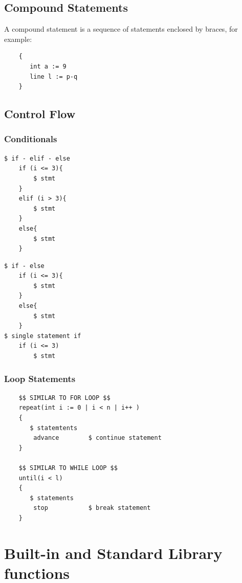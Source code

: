 \documentclass[12pt]{article}
\begin{document}
\subsection{Compound Statements}
A compound statement is a sequence of statements enclosed by braces, for example:
\begin{verbatim}
    {
       int a := 9
       line l := p-q
    }
\end{verbatim}

\subsection{Control Flow}

\subsubsection{Conditionals}
\begin{verbatim}
$ if - elif - else
    if (i <= 3){        
        $ stmt
    }
    elif (i > 3){
        $ stmt
    }
    else{
        $ stmt
    }
\end{verbatim}
\pagebreak
\begin{verbatim}
$ if - else
    if (i <= 3){    
        $ stmt
    }
    else{
        $ stmt
    }
$ single statement if
    if (i <= 3)        
        $ stmt    
\end{verbatim}

\subsubsection{Loop Statements}
\begin{verbatim}
    $$ SIMILAR TO FOR LOOP $$
    repeat(int i := 0 | i < n | i++ )
    {
       $ statemtents
        advance        $ continue statement
    }

    $$ SIMILAR TO WHILE LOOP $$
    until(i < l)
    { 
       $ statements
        stop           $ break statement
    }
\end{verbatim}

\section{Built-in and Standard Library functions}
\end{document}
